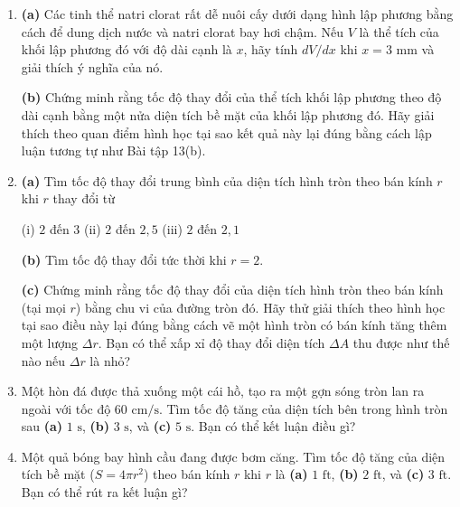 \setlength{\abovedisplayskip}{5pt}
\setlength{\belowdisplayskip}{5pt}
\setlength{\abovedisplayshortskip}{3pt}
\setlength{\belowdisplayshortskip}{3pt}

\noindent
\begin{minipage}[t]{0.48\textwidth}
\begin{enumerate}[label=\textbf{\arabic*.}, leftmargin=1.8em, itemsep=7pt, parsep=0pt, topsep=0pt, start=14]

\item \textbf{(a)} Các tinh thể natri clorat rất dễ nuôi cấy dưới dạng hình lập phương bằng cách để dung dịch nước và natri clorat bay hơi chậm. Nếu $V$ là thể tích của khối lập phương đó với độ dài cạnh là $x$, hãy tính $dV/dx$ khi $x = 3\text{ mm}$ và giải thích ý nghĩa của nó.
\par\vspace{3pt}
\textbf{(b)} Chứng minh rằng tốc độ thay đổi của thể tích khối lập phương theo độ dài cạnh bằng một nửa diện tích bề mặt của khối lập phương đó. Hãy giải thích theo quan điểm hình học tại sao kết quả này lại đúng bằng cách lập luận tương tự như Bài tập 13(b).

\item \textbf{(a)} Tìm tốc độ thay đổi trung bình của diện tích hình tròn theo bán kính $r$ khi $r$ thay đổi từ
\par\vspace{2pt}
\hspace*{0.5em}(i) $2$ đến $3$ \qquad (ii) $2$ đến $2{,}5$ \qquad (iii) $2$ đến $2{,}1$
\par\vspace{3pt}
\textbf{(b)} Tìm tốc độ thay đổi tức thời khi $r = 2$.
\par\vspace{3pt}
\textbf{(c)} Chứng minh rằng tốc độ thay đổi của diện tích hình tròn theo bán kính (tại mọi $r$) bằng chu vi của đường tròn đó. Hãy thử giải thích theo hình học tại sao điều này lại đúng bằng cách vẽ một hình tròn có bán kính tăng thêm một lượng $\Delta r$. Bạn có thể xấp xỉ độ thay đổi diện tích $\Delta A$ thu được như thế nào nếu $\Delta r$ là nhỏ?

\item Một hòn đá được thả xuống một cái hồ, tạo ra một gợn sóng tròn lan ra ngoài với tốc độ $60\text{ cm/s}$. Tìm tốc độ tăng của diện tích bên trong hình tròn sau \textbf{(a)} $1\text{ s}$, \textbf{(b)} $3\text{ s}$, và \textbf{(c)} $5\text{ s}$. Bạn có thể kết luận điều gì?

\item Một quả bóng bay hình cầu đang được bơm căng. Tìm tốc độ tăng của diện tích bề mặt ($S = 4\pi r^2$) theo bán kính $r$ khi $r$ là \textbf{(a)} $1\text{ ft}$, \textbf{(b)} $2\text{ ft}$, và \textbf{(c)} $3\text{ ft}$. Bạn có thể rút ra kết luận gì?


\end{enumerate}
\end{minipage}
